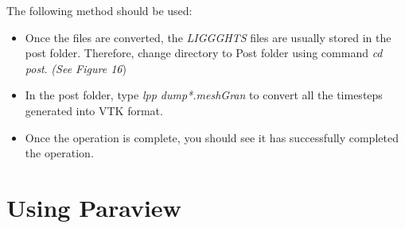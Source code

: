 \documentclass{tufte-book} %
\newcommand{\Li}{\textit{LIGGGHTS}\xspace}
\begin{document}
 The following method should be used:
 \begin{itemize}
 \item Once the files are converted, the \Li files are usually stored in the post folder. Therefore, change directory to Post folder using command \textit{\emph{cd post}}. \textit{(See Figure 16})
 \item In the post folder, type \textit{\emph{lpp dump*.meshGran }} to convert all the timesteps generated into VTK format.
 \item Once the operation is complete, you should see it has successfully completed the operation.
 \end{itemize}
\section[Using Paraview]{Using Paraview }
 
\end{document}
